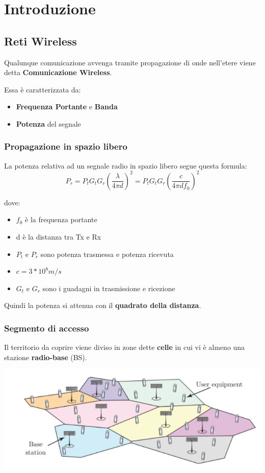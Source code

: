 
\chapter{Introduzione}

\section{Reti Wireless}
Qualunque comunicazione avvenga tramite propagazione di onde nell'etere viene detta \textbf{Comunicazione Wireless}.

Essa è caratterizzata da:
\begin{itemize}
    \item \textbf{Frequenza Portante} e \textbf{Banda}
    \item \textbf{Potenza} del segnale
\end{itemize}

\subsection{Propagazione in spazio libero}
La potenza relativa ad un segnale radio in spazio libero segue questa formula:
\begin{equation*}
    P_r = P_t G_t G_r \left(\frac{\lambda}{4\pi d}\right)^2 = P_t G_t G_r \left(\frac{c}{4\pi d f_0}\right)^2
\end{equation*}

dove:
\begin{itemize}
    \item $f_0$ è la frequenza portante
    \item d è la distanza tra Tx e Rx
    \item $P_t$ e $P_r$ sono potenza trasmessa e potenza ricevuta
    \item $c = 3*10^8 m/s$
    \item $G_t$ e $G_r$ sono i guadagni in trasmissione e ricezione
\end{itemize}

Quindi la potenza si attenua con il \textbf{quadrato della distanza}.
\\
\subsection{Segmento di accesso}
Il territorio da coprire viene diviso in zone dette \textbf{celle} in cui vi è almeno una stazione \textbf{radio-base} (BS).
\begin{center}
    \includegraphics[width=\textwidth]{Images/Accass.png}
\end{center}

